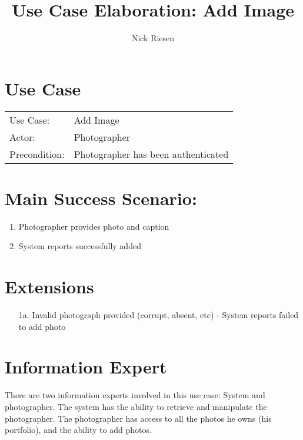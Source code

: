 \documentclass{article}
\title{Use Case Elaboration: Add Image}
\author{ Nick Riesen }
\begin{document}
\maketitle


\section*{Use Case}
\begin{tabular}{l l}
Use Case:     & Add Image                           \\
Actor:        & Photographer                        \\
Precondition: & Photographer has been authenticated \\
\end{tabular}


\section*{Main Success Scenario:}

\begin{enumerate}
    \item Photographer provides photo and caption
    \item System reports successfully added

\end{enumerate}

\section*{Extensions}

\begin{itemize}
    \item [1a.]Invalid photograph provided (corrupt, absent, etc)
        - System reports failed to add photo
\end{itemize}

\section*{Information Expert}
There are two information experts involved in this use case: System and photographer. The system has the ability to retrieve and manipulate the photographer. The photographer has access to all the photos he owns (his portfolio), and the ability to add photos. 
\end{document}
